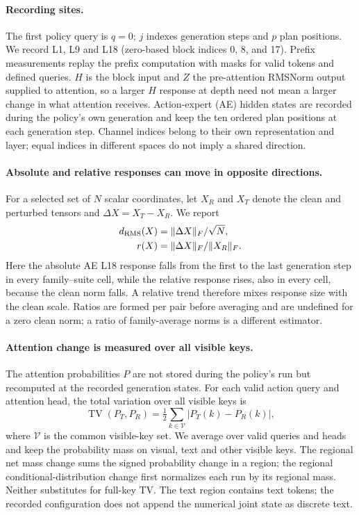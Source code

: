 \paragraph{Recording sites.}
The first policy query is $q=0$; $j$ indexes generation steps and $p$ plan positions. We record L1, L9 and L18 (zero-based block indices 0, 8, and 17). Prefix measurements replay the prefix computation with masks for valid tokens and defined queries. $H$ is the block input and $Z$ the pre-attention RMSNorm output supplied to attention, so a larger $H$ response at depth need not mean a larger change in what attention receives. Action-expert (AE) hidden states are recorded during the policy's own generation and keep the ten ordered plan positions at each generation step. Channel indices belong to their own representation and layer; equal indices in different spaces do not imply a shared direction.

\paragraph{Absolute and relative responses can move in opposite directions.}
For a selected set of $N$ scalar coordinates, let $X_R$ and $X_T$ denote the clean and perturbed tensors and $\Delta X=X_T-X_R$. We report
\begin{align}
 d_{\rm RMS}(X)&=\|\Delta X\|_F/\sqrt{N},\\
 r(X)&=\|\Delta X\|_F/\|X_R\|_F.
\end{align}
Here the absolute AE L18 response falls from the first to the last generation step in every family--suite cell, while the relative response rises, also in every cell, because the clean norm falls. A relative trend therefore mixes response size with the clean scale. Ratios are formed per pair before averaging and are undefined for a zero clean norm; a ratio of family-average norms is a different estimator.

\paragraph{Attention change is measured over all visible keys.}
The attention probabilities $P$ are not stored during the policy's run but recomputed at the recorded generation states. For each valid action query and attention head, the total variation over all visible keys is
\begin{equation}
 \operatorname{TV}(P_T,P_R)=\tfrac12\sum_{k\in\mathcal V}|P_T(k)-P_R(k)|,
\end{equation}
where $\mathcal V$ is the common visible-key set. We average over valid queries and heads and keep the probability mass on visual, text and other visible keys. The regional net mass change sums the signed probability change in a region; the regional conditional-distribution change first normalizes each run by its regional mass. Neither substitutes for full-key TV. The text region contains text tokens; the recorded configuration does not append the numerical joint state as discrete text.

